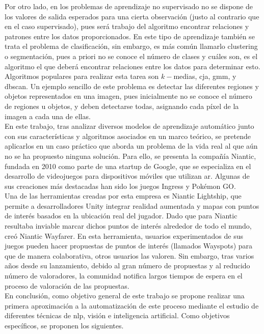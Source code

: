 	Por otro lado, en los problemas de aprendizaje no supervisado no se dispone de los valores de salida esperados para una cierta observación (justo al contrario que en el caso supervisado), pues será trabajo del algoritmo encontrar relaciones y patrones entre los datos proporcionados. En este tipo de aprendizaje también se trata el problema de clasificación, sin embargo, es más común llamarlo clustering o segmentación, pues a priori no se conoce el número de clases y cuáles son, es el algoritmo el que deberá encontrar relaciones entre los datos para determinar esto. Algoritmos populares para realizar esta tarea son $k-$medias, \gls{cja}, \gls{gmm}, y \gls{dbscan}. Un ejemplo sencillo de este problema es detectar las diferentes regiones y objetos representados en una imagen, pues inicialmente no se conoce el número de regiones u objetos, y deben detectarse todas, asignando cada píxel de la imagen a cada una de ellas. \\
	
	En este trabajo, tras analizar diversos modelos de aprendizaje automático junto con sus características y algoritmos asociados en un marco teórico, se pretende aplicarlos en un caso práctico que aborda un problema de la vida real al que aún no se ha propuesto ninguna solución. Para ello, se presenta la compañía Niantic, fundada en 2010 como parte de una startup de Google, que se especializa en el desarrollo de videojuegos para dispositivos móviles que utilizan \gls{ar}. Algunas de sus creaciones más destacadas han sido los juegos Ingress y Pokémon GO. \\
	
	Una de las herramientas creadas por esta empresa es Niantic Lightship, que permite a desarrolladores Unity integrar realidad aumentada y mapas con puntos de interés basados en la ubicación real del jugador. Dado que para Niantic resultaba inviable marcar dichos puntos de interés alrededor de todo el mundo, creó Niantic Wayfarer. En esta herramienta, usuarios experimentados de sus juegos pueden hacer propuestas de puntos de interés (llamados Wayspots) para que de manera colaborativa, otros usuarios las valoren. Sin embargo, tras varios años desde su lanzamiento, debido al gran número de propuestas y al reducido número de valoradores, la comunidad notifica largos tiempos de espera en el proceso de valoración de las propuestas. \\
	
	En conclusión, como objetivo general de este trabajo se propone realizar una primera aproximación a la automatización de este proceso mediante el estudio de diferentes técnicas de \gls{nlp}, visión e inteligencia artificial. Como objetivos específicos, se proponen los siguientes. 
	
